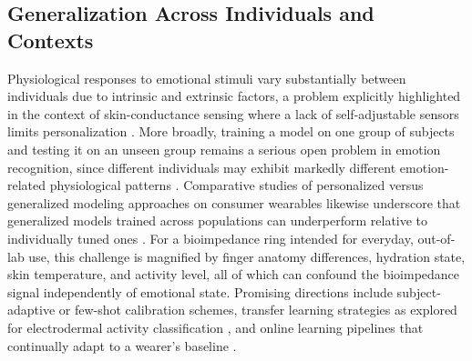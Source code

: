 \subsection{Generalization Across Individuals and Contexts}
Physiological responses to emotional stimuli vary substantially between individuals due to intrinsic and extrinsic factors, a problem explicitly highlighted in the context of skin-conductance sensing where a lack of self-adjustable sensors limits personalization \cite{miranda2023self}. More broadly, training a model on one group of subjects and testing it on an unseen group remains a serious open problem in emotion recognition, since different individuals may exhibit markedly different emotion-related physiological patterns \cite{machot2019deep}. Comparative studies of personalized versus generalized modeling approaches on consumer wearables likewise underscore that generalized models trained across populations can underperform relative to individually tuned ones \cite{li2024comparison}. For a bioimpedance ring intended for everyday, out-of-lab use, this challenge is magnified by finger anatomy differences, hydration state, skin temperature, and activity level, all of which can confound the bioimpedance signal independently of emotional state. Promising directions include subject-adaptive or few-shot calibration schemes, transfer learning strategies as explored for electrodermal activity classification \cite{jacobsen2021classification}, and online learning pipelines that continually adapt to a wearer's baseline \cite{moontaha2023online}.

